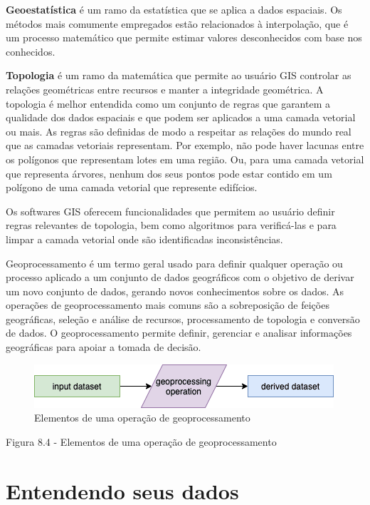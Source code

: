 \documentclass[
]{krantz}
\begin{document}
\textbf{Geoestatística} é um ramo da estatística que se aplica a dados espaciais. Os métodos mais comumente empregados estão relacionados à interpolação, que é um processo matemático que permite estimar valores desconhecidos com base nos conhecidos.

\textbf{Topologia} é um ramo da matemática que permite ao usuário GIS controlar as relações geométricas entre recursos e manter a integridade geométrica. A topologia é melhor entendida como um conjunto de regras que garantem a qualidade dos dados espaciais e que podem ser aplicados a uma camada vetorial ou mais. As regras são definidas de modo a respeitar as relações do mundo real que as camadas vetoriais representam. Por exemplo, não pode haver lacunas entre os polígonos que representam lotes em uma região. Ou, para uma camada vetorial que representa árvores, nenhum dos seus pontos pode estar contido em um polígono de uma camada vetorial que represente edifícios.

Os softwares GIS oferecem funcionalidades que permitem ao usuário definir regras relevantes de topologia, bem como algoritmos para verificá-las e para limpar a camada vetorial onde são identificadas inconsistências.

Geoprocessamento é um termo geral usado para definir qualquer operação ou processo aplicado a um conjunto de dados geográficos com o objetivo de derivar um novo conjunto de dados, gerando novos conhecimentos sobre os dados. As operações de geoprocessamento mais comuns são a sobreposição de feições geográficas, seleção e análise de recursos, processamento de topologia e conversão de dados. O geoprocessamento permite definir, gerenciar e analisar informações geográficas para apoiar a tomada de decisão.

\begin{figure}
\centering
\includegraphics{media/modulo8/fig84.png}
\caption{Elementos de uma operação de geoprocessamento}
\end{figure}

Figura 8.4 - Elementos de uma operação de geoprocessamento

\hypertarget{entendendo-seus-dados}{%
\section{Entendendo seus dados}\label{entendendo-seus-dados}}
\end{document}
